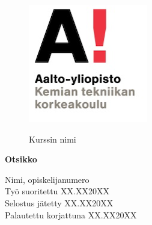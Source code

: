 \documentclass[11pt]{article}
\begin{document}
\begin{titlepage}
\begin{figure}[t]
    \includegraphics[scale=1.2]{Kuvat/Kemiantekniikan korkeakoulu.png}
    \vspace*{1cm}
    \begin{flushleft}
    {\fontsize{11}{10}\selectfont Kurssin nimi}
    \end{flushleft}
\end{figure}


\vspace*{4cm}

\begin{center}
\fontsize{16}{15}
\textbf{Otsikko}
\end{center}

\vfill
\hfill\begin{minipage}{0.4\linewidth}
{\fontsize{11}{10}\selectfont
Nimi, opiskelijanumero \\
\newline
Työ suoritettu \hfill XX.XX20XX\\
Selostus jätetty \hfill XX.XX20XX \\
Palautettu korjattuna \hfill XX.XX20XX}
\end{minipage}


\date{}

\end{titlepage}

\end{document}
